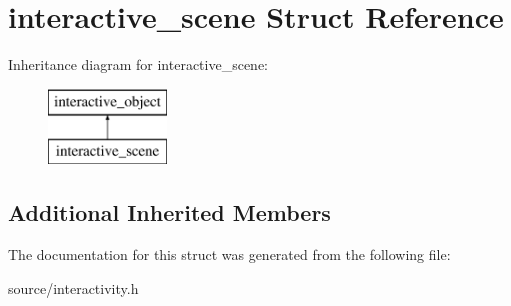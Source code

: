 \hypertarget{structinteractive__scene}{}\section{interactive\+\_\+scene Struct Reference}
\label{structinteractive__scene}
Inheritance diagram for interactive\+\_\+scene\+:\begin{figure}[H]
\begin{center}
\leavevmode
\includegraphics[height=2.000000cm]{structinteractive__scene}
\end{center}
\end{figure}
\subsection*{Additional Inherited Members}


The documentation for this struct was generated from the following file\+:\begin{DoxyCompactItemize}
\item 
source/interactivity.\+h\end{DoxyCompactItemize}
